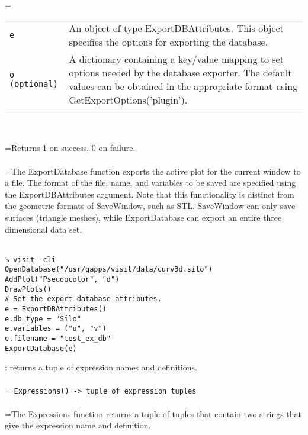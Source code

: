 \documentclass[10pt,a4paper]{report}
\begin{document}
 \\ 
\hangindent=\parindent 
\begin{tabular}{lp{9cm}}
\verb!e! & An object of type ExportDBAttributes.  This object specifies the options for exporting the database. \\
\verb!o (optional)! & A dictionary containing a key/value mapping to set options needed by the database exporter.  The default values can be obtained in the appropriate format using GetExportOptions('plugin'). \\
\end{tabular} \\[-2mm]


 \\ 
\hangindent=\parindent Returns 1 on success, 0 on failure. \\[-3mm] 

 \\ 
\hangindent=\parindent The ExportDatabase function exports the active plot for the current window to a file.  The format of the file, name, and variables to be saved are specified using the ExportDBAttributes argument. Note that this functionality is distinct from the geometric formats of SaveWindow, such as STL.  SaveWindow can only save surfaces (triangle meshes), while ExportDatabase can export an entire three dimensional data set. \\[-3mm] 

\\[-6mm]
\begin{verbatim}% visit -cli
OpenDatabase("/usr/gapps/visit/data/curv3d.silo")
AddPlot("Pseudocolor", "d")
DrawPlots()
# Set the export database attributes.
e = ExportDBAttributes()
e.db_type = "Silo"
e.variables = ("u", "v")
e.filename = "test_ex_db"
ExportDatabase(e)
\end{verbatim}
\newpage


{}
: returns a tuple of expression names and definitions.\\[-3mm]

 \\ 
\hangindent=\parindent 
\verb!Expressions() -> tuple of expression tuples!\\ [-3mm]

 \\ 
\hangindent=\parindent The Expressions function returns a tuple of tuples that contain two strings that give the expression name and definition.  \\[-3mm] 
\end{document}
